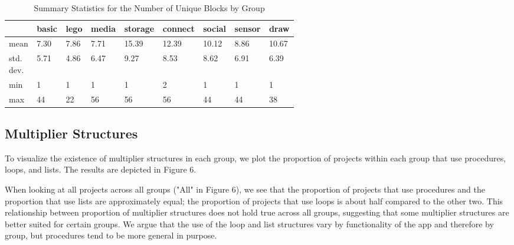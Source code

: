 \documentclass[conference]{IEEEtran}
\begin{document}
\begin{table}[h!]
\renewcommand{\arraystretch}{1.3}
\caption{Summary Statistics for the Number of Unique Blocks by Group}
\label{table_noub_stats}
\centering
\begin{tabular}{| p{0.05\linewidth} | p{0.065\linewidth} | p{0.065\linewidth} | p{0.065\linewidth} | p{0.065\linewidth} | p{0.065\linewidth} | p{0.065\linewidth} | p{0.065\linewidth} | p{0.065\linewidth} | }
\hline

&basic
&lego
&media
&storage
&connect
&social
&sensor
&draw\\
\hline \hline


mean&
7.30&
7.86&
7.71&
15.39&
12.39&
10.12&
8.86&
10.67\\
\hline
std. dev.&
5.71&
4.86&
6.47&
9.27&
8.53&
8.62&
6.91&
6.39\\
\hline

min&
1&
1&
1&
1&
2&
1&
1&
1\\
\hline

max&
44&
22&
56&
56&
56&
44&
44&
38\\


\hline

\end{tabular}
\end{table}

\subsection{Multiplier Structures}
To visualize the existence of multiplier structures in each group, we plot the proportion of projects within each group that use procedures, loops, and lists. The results are depicted in Figure 6.

When looking at all projects across all groups ("All" in Figure 6), we see that the proportion of projects that use procedures and the proportion that use lists are approximately equal; the proportion of projects that use loops is about half compared to the other two. This relationship between proportion of multiplier structures does not hold true across all groups, suggesting that some multiplier structures are better suited for certain groups. We argue that the use of the loop and list structures vary by functionality of the app and therefore by group, but procedures tend to be more general in purpose.
\end{document}
